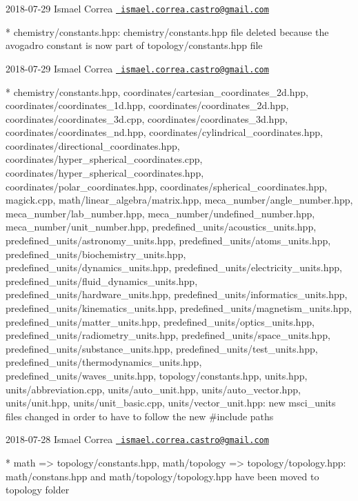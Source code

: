  2018-\/07-\/29 Ismael Correa \href{mailto:ismael.correa.castro@gmail.com}{\texttt{ ismael.\+correa.\+castro@gmail.\+com}} \begin{DoxyVerb}* chemistry/constants.hpp: chemistry/constants.hpp file deleted
because the avogadro constant is now part of topology/constants.hpp
file
\end{DoxyVerb}
 2018-\/07-\/29 Ismael Correa \href{mailto:ismael.correa.castro@gmail.com}{\texttt{ ismael.\+correa.\+castro@gmail.\+com}} \begin{DoxyVerb}* chemistry/constants.hpp,
coordinates/cartesian_coordinates_2d.hpp,
coordinates/coordinates_1d.hpp, coordinates/coordinates_2d.hpp,
coordinates/coordinates_3d.cpp, coordinates/coordinates_3d.hpp,
coordinates/coordinates_nd.hpp,
coordinates/cylindrical_coordinates.hpp,
coordinates/directional_coordinates.hpp,
coordinates/hyper_spherical_coordinates.cpp,
coordinates/hyper_spherical_coordinates.hpp,
coordinates/polar_coordinates.hpp,
coordinates/spherical_coordinates.hpp, magick.cpp,
math/linear_algebra/matrix.hpp, meca_number/angle_number.hpp,
meca_number/lab_number.hpp, meca_number/undefined_number.hpp,
meca_number/unit_number.hpp, predefined_units/acoustics_units.hpp,
predefined_units/astronomy_units.hpp,
predefined_units/atoms_units.hpp,
predefined_units/biochemistry_units.hpp,
predefined_units/dynamics_units.hpp,
predefined_units/electricity_units.hpp,
predefined_units/fluid_dynamics_units.hpp,
predefined_units/hardware_units.hpp,
predefined_units/informatics_units.hpp,
predefined_units/kinematics_units.hpp,
predefined_units/magnetism_units.hpp,
predefined_units/matter_units.hpp,
predefined_units/optics_units.hpp,
predefined_units/radiometry_units.hpp,
predefined_units/space_units.hpp,
predefined_units/substance_units.hpp,
predefined_units/test_units.hpp,
predefined_units/thermodynamics_units.hpp,
predefined_units/waves_units.hpp, topology/constants.hpp,
units.hpp, units/abbreviation.cpp, units/auto_unit.hpp,
units/auto_vector.hpp, units/unit.hpp, units/unit_basic.cpp,
units/vector_unit.hpp: new msci_units files changed in order to have
to follow the new #include paths
\end{DoxyVerb}
 2018-\/07-\/28 Ismael Correa \href{mailto:ismael.correa.castro@gmail.com}{\texttt{ ismael.\+correa.\+castro@gmail.\+com}} \begin{DoxyVerb}* {math => topology}/constants.hpp, {math/topology =>
topology}/topology.hpp: math/constans.hpp and
math/topology/topology.hpp have been moved to topology folder
\end{DoxyVerb}
